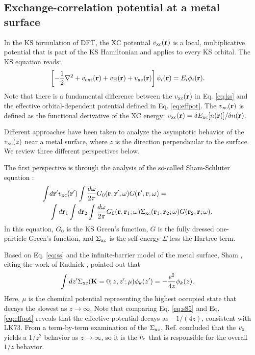 \documentclass[aip, amsmath, amssymb, reprint, longbibliography]{revtex4-2}
\def\mr{\mathbf{r}}
\begin{document}
\subsection{Exchange-correlation potential at a metal surface}
\label{sec:kspot}

In the KS formulation of DFT, the XC potential $v_{\rm xc}(\mr)$ is a local, multiplicative potential that is part of the KS Hamiltonian and applies to every KS orbital. The KS equation reads:
\begin{equation}
\left[-\frac{1}{2}\nabla^2+v_{\rm ext}(\mr)+v_{\rm H}(\mr)+v_{\rm xc}(\mr)\right]\phi_i(\mr)=E_i\phi_i(\mr).
\label{eq:ks}
\end{equation}
Note that there is a fundamental difference between the $v_{\rm xc}(\mr)$ in Eq. \eqref{eq:ks} and the effective orbital-dependent potential defined in Eq. \eqref{eq:effpot}. The $v_{\rm xc}(\mr)$ is defined as the functional derivative of the XC energy: $v_{\rm xc}(\mr)=\delta E_{\rm xc}[n(\mr)]/\delta n(\mr)$.

Different approaches have been taken to analyze the asymptotic behavior of the $v_{\rm xc}(z)$ near a metal surface, where $z$ is the direction perpendicular to the surface. We review three different perspectives below.

The first perspective is through the analysis of the so-called Sham-Schl\"{u}ter equation \cite{SS83}:
\begin{equation}
\begin{split}
\int & d\mr' v_{\rm xc}(\mr')\int \frac{d\omega}{2\pi}G_0(\mr,\mr';\omega)G(\mr',\mr;\omega)= \\
& \int d\mr_1\int d\mr_2 \int \frac{d\omega}{2\pi}G_0(\mr,\mr_1;\omega)\Sigma_{\rm xc}(\mr_1,\mr_2;\omega)G(\mr_2,\mr;\omega). \\
\end{split}
\label{eq:ss}
\end{equation}
In this equation, $G_0$ is the KS Green's function, $G$ is the fully dressed one-particle Green's function, and $\Sigma_{\rm xc}$ is the self-energy $\Sigma$ less the Hartree term. 

Based on Eq. \eqref{eq:ss} and the infinite-barrier model of the metal surface, Sham \cite{S85}, citing the work of Rudnick \cite{R70}, pointed out that
\begin{equation}
\int dz' \Sigma_{\rm xc}(\mathbf{K}=0;z,z';\mu)\phi_k(z')=-\frac{e^2}{4z}\phi_k(z).
\label{eq:s85}
\end{equation}
Here, $\mu$ is the chemical potential representing the highest occupied state that decays the slowest as $z\to\infty$. Note that comparing Eq. \eqref{eq:s85} and Eq. \eqref{eq:effpot} reveals that the effective potential decays as $-1/(4z)$, consistent with LK73\cite{LK73}. From a term-by-term examination of the $\Sigma_{\rm xc}$, Ref.  concluded that the $v_{\rm x}$ yields a $1/z^2$ behavior as $z\to\infty$, so it is the $v_{\rm c}$ that is responsible for the overall $1/z$ behavior.
\end{document}
